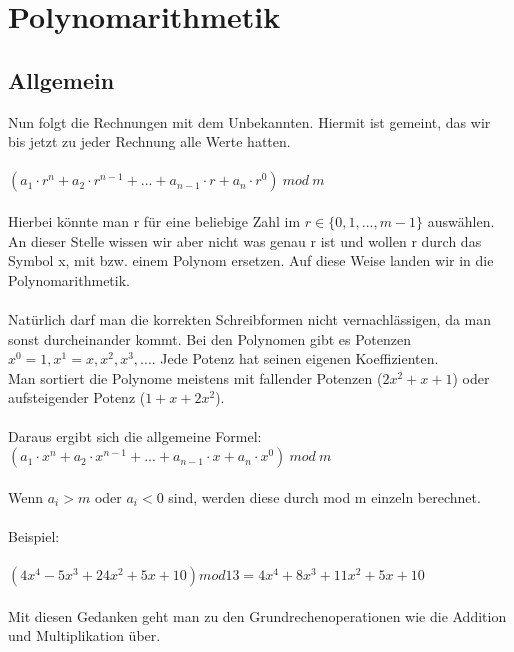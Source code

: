 \section{Polynomarithmetik}

\subsection{Allgemein}
Nun folgt die Rechnungen mit dem Unbekannten. Hiermit ist gemeint, das wir bis jetzt zu jeder Rechnung alle Werte hatten.\\
\\
$
( a_1 \cdot r^n + a_2 \cdot r^{n-1} + ... + a_{n-1} \cdot r + a_n \cdot r^0)\ mod\ m
$
\\
\\
Hierbei könnte man r für eine beliebige Zahl im $ r \in \{0,1,..., m-1\} $ auswählen. An dieser Stelle wissen wir aber nicht was genau r ist
und wollen r durch das Symbol x, mit bzw. einem Polynom ersetzen. Auf diese Weise landen wir in die Polynomarithmetik.\\
\\
Natürlich darf man die korrekten Schreibformen nicht vernachlässigen, da man sonst durcheinander kommt.
Bei den Polynomen gibt es Potenzen $ x^0=1, x^1 = x, x^2, x^3,... $. Jede Potenz hat seinen eigenen Koeffizienten.\\
Man sortiert die Polynome meistens mit fallender Potenzen ($2x^2 + x +1$) oder aufsteigender Potenz ($1 + x + 2x^2$). \\
\\Daraus ergibt sich die allgemeine Formel:
\\
$
( a_1 \cdot x^n + a_2 \cdot x^{n-1} + ... + a_{n-1} \cdot x + a_n \cdot x^0)\ mod\ m
$
\\\\
Wenn $a_i > m $ oder $ a_i < 0 $ sind, werden diese durch mod m einzeln berechnet.\\
\\Beispiel:\\
\\
$ (4x^4  -5x^3 + 24x^2 + 5x +10) mod 13 = 4x^4 +8 x^3 + 11x^2 + 5x +10$\\\\
Mit diesen Gedanken geht man zu den Grundrechenoperationen wie die Addition und Multiplikation über.\\
\newpage
